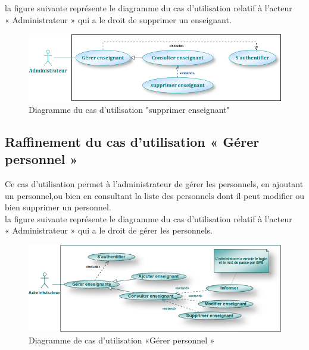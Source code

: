 \documentclass[12 pt]{report}
\begin{document}
la figure suivante représente le diagramme du cas d’utilisation  relatif à l’acteur \\« Administrateur » qui a le droit de supprimer un enseignant.
\begin{figure}[h]
 \begin{center}
\includegraphics[width=13 cm ,height= 4 cm]{a8.PNG}
\caption{Diagramme du cas d’utilisation "supprimer enseignant"}
\end{center}
\end{figure}


\newpage

\subsection{Raffinement du cas d’utilisation « Gérer personnel »}
Ce cas d’utilisation permet à l’administrateur de gérer les personnels, en ajoutant
un personnel,ou bien en consultant la liste des personnels dont il peut modifier ou
bien supprimer un personnel.\\
la figure suivante représente le diagramme du cas d’utilisation  relatif à l’acteur \\« Administrateur » qui a le droit de gérer les personnels.
 \begin{figure}[h]
\includegraphics[width= 15 cm ,height= 6 cm]{admin2.png}
\caption{ Diagramme de cas d'utilisation  «Gérer personnel »}
\end{figure}
\end{document}
